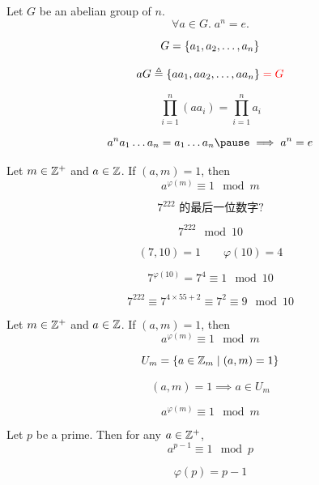 \begin{frame}
  \begin{theorem}
    Let $G$ be an abelian group of  $n$.
    \[
      \forall a \in G.\; a^n = e.
    \]
  \end{theorem}

  \pause
  \[
    G = \{a_{1}, a_{2}, \dots, a_{n}\}
  \]

  \pause
  \[
    aG \triangleq \{aa_{1}, aa_{2}, \dots, aa_{n}\} \;\textcolor{red}{= G}
  \]

  \pause
  \[
    \prod_{i=1}^{n} (a a_i) = \prod_{i=1}^{n} a_i
  \]

  \pause
  \[
    a^{n} a_{1} \dots a_{n} = a_{1} \dots a_{n} \pause \implies a^{n} = e
  \]
\end{frame}

\begin{frame}
  \begin{theorem}
    Let $m \in \mathbb{Z}^{+}$ and $a \in \mathbb{Z}$.
    If $(a, m) = 1$, then
    \[
      a^{\varphi(m)} \equiv 1 \mod{m}
    \]
  \end{theorem}

  \pause
  \[
    7^{222} \text{ 的最后一位数字?}
  \]

  \pause
  \[
    7^{222} \mod{10}
  \]

  \pause
  \[
    (7, 10) = 1 \qquad \varphi(10) = 4
  \]

  \pause
  \[
    7^{\varphi(10)} = 7^{4} \equiv 1 \mod{10}
  \]

  \pause
  \[
    7^{222} \equiv 7^{4 \times 55 + 2} \equiv 7^{2} \equiv 9 \mod{10}
  \]
\end{frame}

\begin{frame}
  \begin{theorem}
    Let $m \in \mathbb{Z}^{+}$ and $a \in \mathbb{Z}$.
    If $(a, m) = 1$, then
    \[
      a^{\varphi(m)} \equiv 1 \mod{m}
    \]
  \end{theorem}

  \pause
  \vspace{0.30cm}
  \[
    U_{m} = \{a \in \mathbb{Z}_{m} \mid (a, m) = 1\}
  \]

  \pause
  \[
    (a, m) = 1 \implies a \in U_{m}
  \]

  \pause
  \[
    a^{\varphi(m)} \equiv 1 \mod{m}
  \]
\end{frame}

\begin{frame}
  \begin{theorem}
    Let $p$ be a prime. Then for any $a \in \mathbb{Z}^{+}$,
    \[
      a^{p-1} \equiv 1 \mod{p}
    \]
  \end{theorem}

  \pause
  \[
    \varphi(p) = p - 1
  \]
\end{frame}
